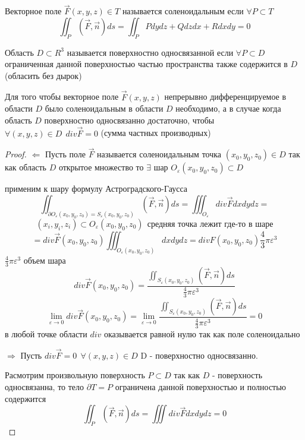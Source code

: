 \begin{define}[соленоидальности]
  Векторное поле $\vec F(x,y,z) \in T$ называется соленоидальным если
  $\forall P \subset T$
  $$
  \iint_P (\vec F, \vec n) ds = \iint_P Pdydz + Q dzdx + R dxdy = 0
  $$
\end{define}

\begin{define}
  Область $D \subset R^3$ называется поверхностно односвязанной если
  $\forall P \subset D$ ограниченная данной поверхностью частью пространства
  также содержится в $D$ (обласить без дырок)
\end{define}

\begin{block}
  Для того чтобы векторное поле $\vec F(x,y,z)$ непрерывно дифференцируемое в
  области $D$ было соленоидальным в области $D$ необходимо, а в случае когда
  область $D$ поверхностно односвязанно достаточно, чтобы
  $\forall (x,y,z) \in D ~~ div \vec F = 0$ (сумма частных производных)
\end{block}

\begin{proof}
  $\Leftarrow$ Пусть поле $\vec F$ называется соленоидальным точка
  $(x_0, y_0, z_0) \in D$ так как область $D$ открытое множество то $\exists$
  шар $O_{\varepsilon}(x_0, y_0, z_0) \subset D$

  применим к шару формулу Астроградского-Гаусса
  $$
  \iint_{\partial O_{\varepsilon}(x_0, y_0, z_0) =
  S_{\varepsilon}(x_0, y_0, z_0)} (\vec F, \vec n) ds =
  \iiint_{O_{\varepsilon}} div \vec F dxdydz =
  $$
  $$
  (x_i, y_i, z_i) \subset O_{\varepsilon}(x_0, y_0, z_0) ~~ \text{средняя точка
  лежит где-то в шаре}
  $$
  $$
  = div \vec F(x_0, y_0, z_0) \iiint_{O_{\varepsilon}(x_0, y_0, z_0)} dxdydz =
  div F(x_0, y_0, z_0) \frac{4}{3} \pi \varepsilon^3
  $$
  $\frac{4}{3} \pi \varepsilon^3$ объем шара
  $$
  div \vec F(x_0, y_0, z_0) = \frac{\iint_{S_{\varepsilon}(x_0, y_0, z_0)}
  (\vec F, \vec n) ds}{\frac{4}{3} \pi \varepsilon^3}
  $$
  $$
  \lim_{\varepsilon \to 0} div \vec F(x_0, y_0, z_0) = \lim_{\varepsilon \to 0}
  \frac{\iint_{S_{\varepsilon}(x_0, y_0, z_0)}(\vec F, \vec n) ds}
  {\frac{4}{3} \pi \varepsilon^3} = 0
  $$
  в любой точке области $div$ оказывается равной нулю так как поле соленоидально

  $\Rightarrow$ Пусть $div \vec F = 0 ~~ \forall (x,y,z) \in D$ D - поверхностно
  односвязанно.

  Расмотрим произвольную поверхность $P \subset D$ так как $D$ - поверхность
  односвязанна, то тело $\partial T = P$ ограничена данной поверхностью и
  полностью содержится
  $$
  \iint_P (\vec F, \vec n) ds = \iiint div \vec F dx dy dz = 0
  $$
\end{proof}

